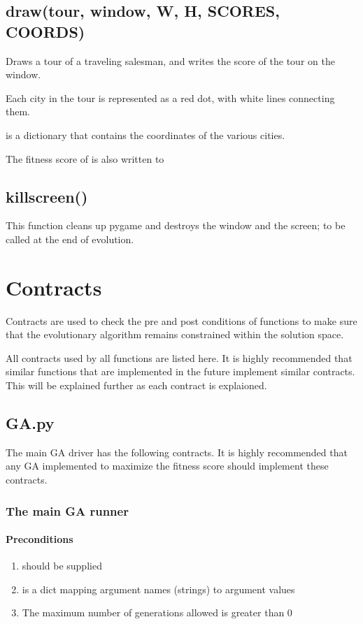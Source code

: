 \documentclass[letterpaper,10pt,english]{sphinxmanual}
\begin{document}
\section{draw(tour, window, W, H, SCORES, COORDS)}
\label{visualization.py:draw-tour-window-w-h-scores-coords}
Draws a tour of a traveling salesman, and writes the score of the tour on the window.

Each city in the tour is represented as a red dot, with white lines connecting them.

 is a dictionary that contains the coordinates of the various cities.

The fitness score of  is also written to 


\section{killscreen()}
\label{visualization.py:killscreen}
This function cleans up pygame and destroys the window and the screen; to be called at the end of evolution.


\chapter{Contracts}
\label{contracts:contracts}\label{contracts::doc}
Contracts are used to check the pre and post conditions of functions to make sure that the evolutionary algorithm remains constrained within the solution space.

All contracts used by all functions are listed here. It is highly recommended that similar functions that are implemented in the future implement similar contracts. This will be explained further as each contract is explaioned.


\section{GA.py}
\label{contracts:ga-py}
The main GA driver has the following contracts. It is highly recommended that any GA implemented to maximize the fitness score should implement these contracts.


\subsection{The main GA runner}
\label{contracts:the-main-ga-runner}

\subsubsection{Preconditions}
\label{contracts:preconditions}\begin{enumerate}
\item {} 
 should be supplied

\item {} 
 is a dict mapping argument names (strings) to argument values

\item {} 
The maximum number of generations allowed is greater than 0

\end{enumerate}
\end{document}
